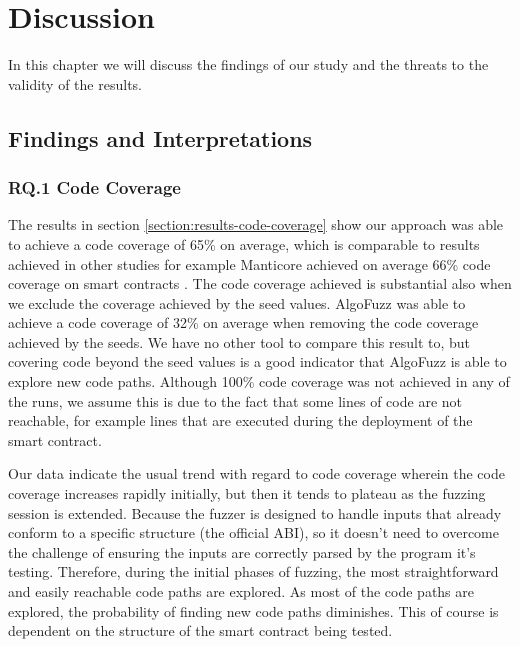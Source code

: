 
\chapter{Discussion}\label{chapter:discussion}
In this chapter we will discuss the findings of our study and the threats to the validity of the results.

\section{Findings and Interpretations}

\subsection*{RQ.1 Code Coverage}
The results in section \ref{section:results-code-coverage} show our approach was able to achieve a code coverage of 65\% on average, which is comparable to results achieved in other studies for example Manticore achieved on average 66\% code coverage on smart contracts \cite{mossberg_manticore_2019}.
The code coverage achieved is substantial also when we exclude the coverage achieved by the seed values.
AlgoFuzz was able to achieve a code coverage of 32\% on average when removing the code coverage achieved by the seeds.
We have no other tool to compare this result to, but covering code beyond the seed values is a good indicator that AlgoFuzz is able to explore new code paths.
Although 100\% code coverage was not achieved in any of the runs, we assume this is due to the fact that some lines of code are not reachable, for example lines that are executed during the deployment of the smart contract.

Our data indicate the usual trend with regard to code coverage wherein the code coverage increases rapidly initially, but then it tends to plateau as the fuzzing session is extended.
Because the fuzzer is designed to handle inputs that already conform to a specific structure (the official \ac{ABI}), so it doesn't need to overcome the challenge of ensuring the inputs are correctly parsed by the program it's testing.
Therefore, during the initial phases of fuzzing, the most straightforward and easily reachable code paths are explored.
As most of the code paths are explored, the probability of finding new code paths diminishes.
This of course is dependent on the structure of the smart contract being tested.

